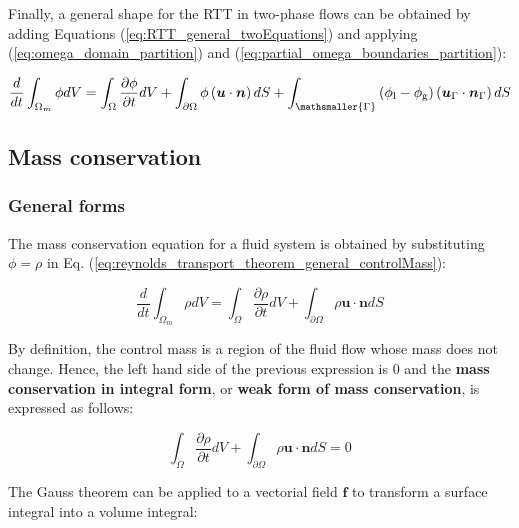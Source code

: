 Finally, a general shape for the RTT in two-phase flows can be obtained by adding Equations (\ref{eq:RTT_general_twoEquations}) and applying (\ref{eq:omega_domain_partition}) and (\ref{eq:partial_omega_boundaries_partition}):

\begin{equation}
\label{eq:RTT_general_bothPhases}
\frac{d}{dt} \int_{\Omega_m} \phi dV =  \int_{\Omega} \frac{\partial \phi}{\partial t}  dV + \int_{\partial \Omega} \phi \left( \boldsymbol{u} \cdot \boldsymbol{n} \right) dS + \int_\mathsmaller{\Gamma} \left( \phi_\mathrm{l} - \phi_\mathrm{g} \right) \left( \boldsymbol{u}_{\scriptsize{\Gamma}} \cdot \boldsymbol{n}_{\scriptsize{\Gamma}} \right) dS
\end{equation}





\subsection{Mass conservation}

\subsubsection*{General forms}

The mass conservation equation for a fluid system is obtained by substituting $\phi = \rho$ in Eq. (\ref{eq:reynolds_transport_theorem_general_controlMass}):

\begin{equation}
\frac{d}{dt} \int_{\Omega_m} \rho  dV =  \int_\Omega \frac{\partial \rho}{\partial t} dV + \int_{\partial \Omega} \rho \boldsymbol{u} \cdot \boldsymbol{n} dS
\end{equation}

By definition, the control mass is a region of the fluid flow whose mass does not change. Hence, the left hand side of the previous expression is $0$ and the \textbf{mass conservation in integral form}, or \textbf{weak form of mass conservation}, is expressed as follows:


\begin{equation}
\label{eq:mass_conservation_general_integral}
\boxed{
\int_\Omega \frac{\partial \rho}{\partial t}   dV + \int_{\partial \Omega} \rho \boldsymbol{u} \cdot \boldsymbol{n} dS = 0
}
\end{equation}

The Gauss theorem can be applied to a vectorial field $\boldsymbol{f}$ to transform a surface integral into a volume integral:

